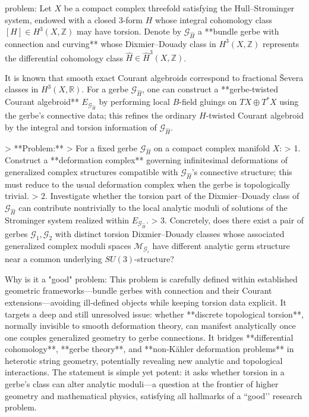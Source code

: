 problem:  
Let \(X\) be a compact complex threefold satisfying the Hull–Strominger system, endowed with a closed 3‑form \(H\) whose integral cohomology class \([H] \in H^3(X,\mathbb{Z})\) may have torsion.  Denote by \(\mathcal{G}_{\widehat{H}}\) a **bundle gerbe with connection and curving** whose Dixmier–Douady class in \(H^3(X,\mathbb{Z})\) represents the differential cohomology class \(\widehat{H} \in \widehat{H}^3(X,\mathbb{Z})\).  

It is known that smooth exact Courant algebroids correspond to fractional Ševera classes in \(H^3(X,\mathbb{R})\).  For a gerbe \(\mathcal{G}_{\widehat{H}}\), one can construct a **gerbe‑twisted Courant algebroid** \(E_{\mathcal{G}_{\widehat{H}}}\) by performing local \(B\)-field gluings on \(TX \oplus T^*X\) using the gerbe’s connective data; this refines the ordinary \(H\)-twisted Courant algebroid by the integral and torsion information of \(\mathcal{G}_{\widehat{H}}\).

> **Problem:**  
> For a fixed gerbe \(\mathcal{G}_{\widehat{H}}\) on a compact complex manifold \(X\):  
> 1. Construct a **deformation complex** governing infinitesimal deformations of generalized complex structures compatible with \(\mathcal{G}_{\widehat{H}}\)’s connective structure; this must reduce to the usual deformation complex when the gerbe is topologically trivial.  
> 2. Investigate whether the torsion part of the Dixmier–Douady class of \(\mathcal{G}_{\widehat{H}}\) can contribute nontrivially to the local analytic moduli of solutions of the Strominger system realized within \(E_{\mathcal{G}_{\widehat{H}}}\).  
> 3.  Concretely, does there exist a pair of gerbes \(\mathcal{G}_1,\mathcal{G}_2\) with distinct torsion Dixmier–Douady classes whose associated generalized complex moduli spaces \(\mathcal{M}_{\mathcal{G}_i}\) have different analytic germ structure near a common underlying \(SU(3)\)-structure?  

Why is it a "good" problem:  
This problem is carefully defined within established geometric frameworks—bundle gerbes with connection and their Courant extensions—avoiding ill‑defined objects while keeping torsion data explicit.  It targets a deep and still unresolved issue: whether **discrete topological torsion**, normally invisible to smooth deformation theory, can manifest analytically once one couples generalized geometry to gerbe connections.  It bridges **differential cohomology**, **gerbe theory**, and **non‑Kähler deformation problems** in heterotic string geometry, potentially revealing new analytic and topological interactions.  The statement is simple yet potent: it asks whether torsion in a gerbe’s class can alter analytic moduli—a question at the frontier of higher geometry and mathematical physics, satisfying all hallmarks of a “good’’ research problem.